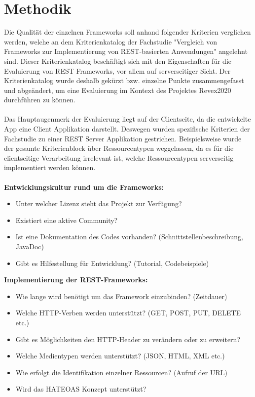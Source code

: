 \section{Methodik}
\label{sec:methodik}
Die Qualität der einzelnen Frameworks soll anhand folgender Kriterien verglichen werden, welche an dem Kriterienkatalog der Fachstudie "Vergleich von Frameworks zur Implementierung von REST-basierten Anwendungen" \cite{vergleich13} angelehnt sind. Dieser Kriterienkatalog beschäftigt sich mit den Eigenschaften für die Evaluierung von REST Frameworks, vor allem auf serverseitiger Sicht. Der Kriterienkatalog wurde deshalb gekürzt bzw. einzelne Punkte zusammengefasst und abgeändert, um eine Evaluierung im Kontext des Projektes Revex2020 durchführen zu können. 
\\\\
Das Hauptaugenmerk der Evaluierung liegt auf der Clientseite, da die entwickelte App eine Client Applikation darstellt. Deswegen wurden spezifische Kriterien der Fachstudie zu einer REST Server Applikation gestrichen. Beispielsweise wurde der gesamte Kriterienblock über Ressourcentypen \cite{ressourcen:rest} weggelassen, da es für die clientseitige Verarbeitung irrelevant ist, welche Ressourcentypen serverseitig implementiert werden können. 
\\\\
\textbf{Entwicklungskultur rund um die Frameworks:}
\begin{itemize}
	\item Unter welcher Lizenz steht das Projekt zur Verfügung?
	\item Existiert eine aktive Community?
	\item Ist eine Dokumentation des Codes vorhanden? (Schnittstellenbeschreibung, JavaDoc)	
	\item Gibt es Hilfestellung für Entwicklung? (Tutorial, Codebeispiele)
\end{itemize}

\textbf{Implementierung der REST-Frameworks:}
\begin{itemize}
	\item Wie lange wird benötigt um das Framework einzubinden?  (Zeitdauer)
	\item Welche \acrfull{HTTP}-Verben werden unterstützt? (GET, POST, PUT, DELETE etc.)
	\item Gibt es Möglichkeiten den HTTP-Header zu verändern oder zu erweitern?
	\item Welche Medientypen werden unterstützt? (JSON, HTML, XML etc.)
	\item Wie erfolgt die Identifikation einzelner Ressourcen? (Aufruf der URL)
	\item Wird das HATEOAS Konzept unterstützt?
\end{itemize}

